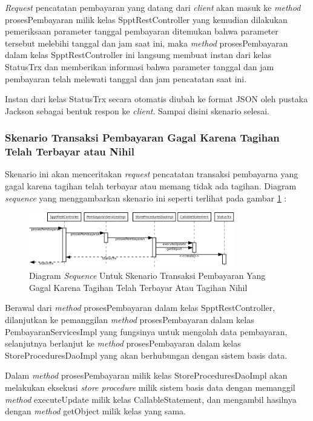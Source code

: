 \documentclass[pdftex,12pt, oneside]{article}
\begin{document}
\textit{Request} pencatatan pembayaran yang datang dari \textit{client} akan masuk ke \textit{method} prosesPembayaran milik kelas SpptRestController yang kemudian dilakukan pemeriksaan parameter tanggal pembayaran ditemukan bahwa parameter tersebut melebihi tanggal dan jam saat ini, maka \textit{method} prosesPembayaran dalam kelas SpptRestController ini langsung membuat instan dari kelas StatusTrx dan memberikan informasi bahwa parameter tanggal dan jam pembayaran telah melewati tanggal dan jam pencatatan saat ini.

Instan dari kelas StatusTrx secara otomatis diubah ke format JSON oleh pustaka Jackson sebagai bentuk respon ke \textit{client}. Sampai disini skenario selesai.

\subsubsection{Skenario Transaksi Pembayaran Gagal Karena Tagihan Telah Terbayar atau Nihil}

Skenario ini akan menceritakan \textit{request} pencatatan transaksi pembayarna yang gagal karena tagihan telah terbayar atau memang tidak ada tagihan. Diagram \textit{sequence} yang menggambarkan skenario ini seperti terlihat pada gambar \ref{fig:uml-seq-trx-nihil} :

\begin{figure}[H]
  \centering
  \includegraphics[width=0.8\textwidth]{./resources/diagram/uml-seq-trx-nihil}
  \caption{Diagram \textit{Sequence} Untuk Skenario Transaksi Pembayaran Yang Gagal Karena Tagihan Telah Terbayar Atau Tagihan Nihil}
  \label{fig:uml-seq-trx-nihil}
\end{figure}

Berawal dari \textit{method} prosesPembayaran dalam kelas SpptRestController, dilanjutkan ke pemanggilan \textit{method} prosesPembayaran dalam kelas PembayaranServicesImpl yang fungsinya untuk mengolah data pembayaran, selanjutnya berlanjut ke \textit{method} prosesPembayaran dalam kelas StoreProceduresDaoImpl yang akan berhubungan dengan sistem basis data.

Dalam \textit{method} prosesPembayaran milik kelas StoreProceduresDaoImpl akan melakukan eksekusi \textit{store procedure} milik sistem basis data dengan memanggil \textit{method} executeUpdate milik kelas CallableStatement, dan mengambil hasilnya dengan \textit{method} getObject milik kelas yang sama.
\end{document}

